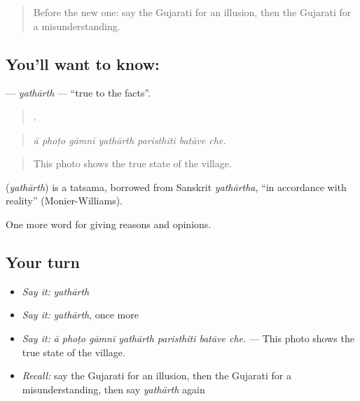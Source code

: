 \label{lesson:GU-C351-yatharth}



\begin{quote}
Before the new one: say the Gujarati for an illusion, then the Gujarati for a misunderstanding.
\end{quote}

\subsection*{You'll want to know: }
\textbf{} — \emph{yathārth} — \textquotedblleft{}true to the facts\textquotedblright{}.

\begin{quote}
      .
\end{quote}

\begin{quote}
\emph{ā phoṭo gāmnī yathārth paristhiti batāve che.}
\end{quote}

\begin{quote}
This photo shows the true state of the village.
\end{quote}

\begin{cousinweb}
\textbf{} (\emph{yathārth}) is a tatsama, borrowed from Sanskrit \emph{yathārtha}, \textquotedblleft{}in accordance with reality\textquotedblright{} (Monier-Williams).
\end{cousinweb}

\begin{grammarlens}[title={What you've built}]
One more word for giving reasons and opinions.
\end{grammarlens}

\subsection*{Your turn}
\begin{itemize}
\raggedright
  \item \emph{Say it:} \emph{yathārth}
  \item \emph{Say it:} \emph{yathārth}, once more
  \item \emph{Say it:} \emph{ā phoṭo gāmnī yathārth paristhiti batāve che.} — This photo shows the true state of the village.
  \item \emph{Recall:} say the Gujarati for an illusion, then the Gujarati for a misunderstanding, then say \emph{yathārth} again
\end{itemize}

